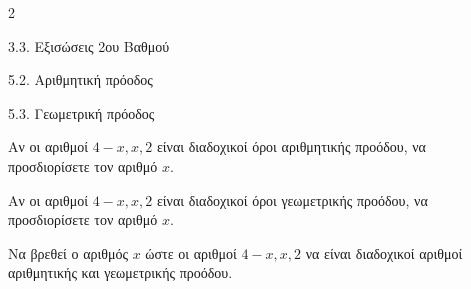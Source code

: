 \begin{ylh}{2}
    \item 3.3. Εξισώσεις 2ου Βαθμού
    \item 5.2. Αριθμητική πρόοδος
    \item 5.3. Γεωμετρική πρόοδος
\end{ylh}

\begin{alist}
\item Αν οι αριθμοί $4 - x, x, 2$ είναι διαδοχικοί όροι αριθμητικής προόδου, να προσδιορίσετε τον αριθμό $x$.
\item Αν οι αριθμοί $4 - x, x, 2$ είναι διαδοχικοί όροι γεωμετρικής προόδου, να προσδιορίσετε τον αριθμό $x$.
\item Να βρεθεί ο αριθμός $x$ ώστε οι αριθμοί $4 - x, x, 2$ να είναι διαδοχικοί αριθμοί αριθμητικής και γεωμετρικής προόδου.
\end{alist}

